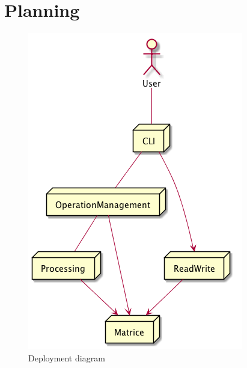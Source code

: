 \chapter{Planning}

\begin{figure}[h]
    \begin{center}
        \includegraphics[scale=0.40]{./ressources/graph/deployment.png}
    \end{center}
    \caption{Deployment diagram}
    \label{Solution - Deployment diagram}
\end{figure}
\bigskip

